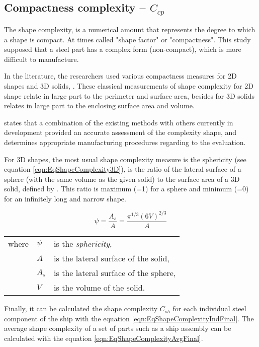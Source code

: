 \subsection{Compactness complexity -- $C_{cp}$}
The shape complexity, is a numerical amount that represents the degree to which a shape is compact. At times called "shape factor" or "compactness". This study supposed that a steel part has a complex form (non-compact), which is more difficult to manufacture.

In the literature, the researchers used various compactness measures for 2D shapes and 3D solids, \cite{valentan2008}. These classical measurements of shape complexity for 2D shape relate in large part to the perimeter and surface area, besides for 3D solids relates in large part to the enclosing surface area and volume.

\cite{valentan2008} states that a combination of the existing methods with others currently in development provided an accurate assessment of the complexity shape, and determines appropriate manufacturing procedures regarding to the evaluation.

For 3D shapes, the most usual shape complexity measure is the sphericity (see equation \ref{eqn:EqShapeComplexity3D}), is the ratio of the lateral surface of a sphere (with the same volume as the given solid) to the surface area of a 3D solid, defined by \cite{wadell1935volume}. %
This ratio is maximum (=1) for a sphere and minimum (=0) for an infinitely long and narrow shape.

\begin{equation}
\psi = \frac{A_s}{A}= \frac{\pi^{1/3}(6V)^{2/3}}{A}
\label{eqn:EqShapeComplexity3D}
\end{equation}

\begin{tabular}{l l l}
where		& $\psi$ 	& is the \textit{sphericity},\\
				& $A$		& is the lateral surface of the solid,\\
				& $A_s$	& is the lateral surface of the sphere,\\
				& $V$		& is the volume of the solid.
\end{tabular}

Finally, it can be calculated the shape complexity $C_{sh}$ for each individual steel component of the ship with the equation \ref{eqn:EqShapeComplexityIndFinal}. The average shape complexity of a set of parts such as a ship assembly can be calculated  with the equation \ref{eqn:EqShapeComplexityAvgFinal}.
	
